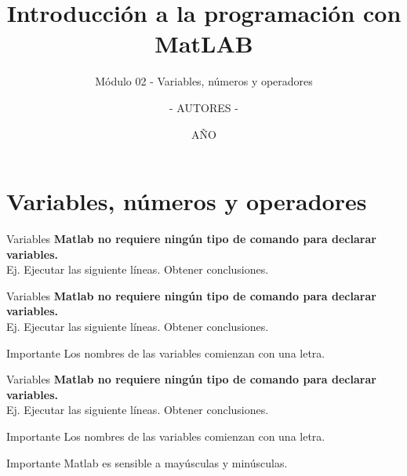 \documentclass{bredelebeamer}
\title[Programación en MatLAB]{Introducción a la programación con MatLAB}
\subtitle{Módulo 02 - Variables, números y operadores}
\author{- AUTORES - \inst{1}}
\institute[UNIVERSIDAD]
{
  \inst{1}%
  - NOMBRE UNIVERSIDAD - 
  }
\date{AÑO}
\begin{document}
\begin{frame}
  \titlepage 
\end{frame}




\section{Variables, números y operadores}

\begin{frame}{Variables}
\textbf{Matlab no requiere ningún tipo de comando para declarar variables.}\\
Ej. Ejecutar las siguiente líneas. Obtener conclusiones.

\end{frame}

\begin{frame}{Variables}
\textbf{Matlab no requiere ningún tipo de comando para declarar variables.}\\
Ej. Ejecutar las siguiente líneas. Obtener conclusiones.

\begin{alertblock}{Importante}
Los nombres de las variables comienzan con una letra.
\end{alertblock}
\end{frame}

\begin{frame}{Variables}
\textbf{Matlab no requiere ningún tipo de comando para declarar variables.}\\
Ej. Ejecutar las siguiente líneas. Obtener conclusiones.

\begin{alertblock}{Importante}
Los nombres de las variables comienzan con una letra.
\end{alertblock}
\begin{alertblock}{Importante}
Matlab es sensible a mayúsculas y minúsculas.
\end{alertblock}
\end{frame}
\end{document}
